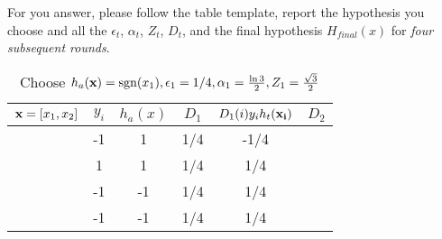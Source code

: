 For you answer, please follow the table template, report the
hypothesis you choose and all the $\epsilon_t$, $\alpha_t$, $Z_t$,
$D_t$, and the final hypothesis $H_{final}(x)$ for {\em four
  subsequent rounds}.
\begin{table}[H]
  \centering
  \caption{Choose $h_a({\bf x}) = \operatorname{sgn}(x_1), \epsilon_1 = 1/4, \alpha_1 = \frac{\ln3}{2}, Z_1 = \frac{\sqrt{3}}{2}$}
  \label{tab:Ada1}
  \begin{tabular}{|c|c|c|c|c|c|}
    \hline
    ${\bf x} = [x_1,x_2]$ & $y_i$ & $h_a(x)$ & $D_1$ & $D_{1}(i)y_{i}h_t({\bf x_i})$ & $D_2$ \\ \hline
    [1,1]          &     -1  & 1    & 1/4   & -1/4                          &       \\ \hline
    [1,-1]         &    1   & 1    & 1/4   & 1/4                           &       \\ \hline
    [-1,-1]        &     -1  & -1    & 1/4   & 1/4                           &       \\ \hline
    [-1,1]         &     -1 & -1    & 1/4   & 1/4                           &       \\ \hline
  \end{tabular}
\end{table}


